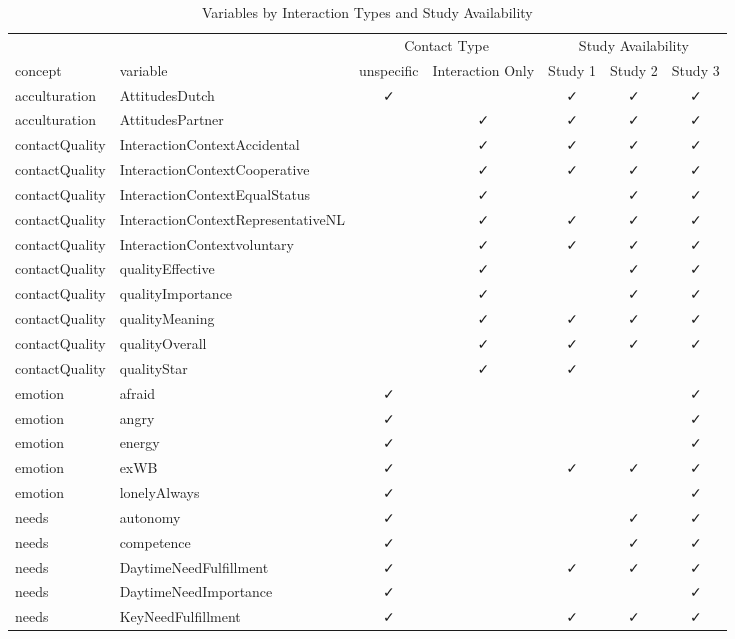 \begin{table}

\caption{\label{tab:variable names by response type and study}Variables by Interaction Types and Study Availability}
\centering
\begin{tabular}[t]{llccccc}
\toprule
\multicolumn{2}{c}{ } & \multicolumn{2}{c}{Contact Type} & \multicolumn{3}{c}{Study Availability} \\
\cmidrule(l{3pt}r{3pt}){3-4} \cmidrule(l{3pt}r{3pt}){5-7}
concept & variable & unspecific & Interaction Only & Study 1 & Study 2 & Study 3\\
\midrule
acculturation & AttitudesDutch & ✓ &  & ✓ & ✓ & ✓\\
acculturation & AttitudesPartner &  & ✓ & ✓ & ✓ & ✓\\
contactQuality & InteractionContextAccidental &  & ✓ & ✓ & ✓ & ✓\\
contactQuality & InteractionContextCooperative &  & ✓ & ✓ & ✓ & ✓\\
contactQuality & InteractionContextEqualStatus &  & ✓ &  & ✓ & ✓\\
\addlinespace
contactQuality & InteractionContextRepresentativeNL &  & ✓ & ✓ & ✓ & ✓\\
contactQuality & InteractionContextvoluntary &  & ✓ & ✓ & ✓ & ✓\\
contactQuality & qualityEffective &  & ✓ &  & ✓ & ✓\\
contactQuality & qualityImportance &  & ✓ &  & ✓ & ✓\\
contactQuality & qualityMeaning &  & ✓ & ✓ & ✓ & ✓\\
\addlinespace
contactQuality & qualityOverall &  & ✓ & ✓ & ✓ & ✓\\
contactQuality & qualityStar &  & ✓ & ✓ &  & \\
emotion & afraid & ✓ &  &  &  & ✓\\
emotion & angry & ✓ &  &  &  & ✓\\
emotion & energy & ✓ &  &  &  & ✓\\
\addlinespace
emotion & exWB & ✓ &  & ✓ & ✓ & ✓\\
emotion & lonelyAlways & ✓ &  &  &  & ✓\\
needs & autonomy & ✓ &  &  & ✓ & ✓\\
needs & competence & ✓ &  &  & ✓ & ✓\\
needs & DaytimeNeedFulfillment & ✓ &  & ✓ & ✓ & ✓\\
\addlinespace
needs & DaytimeNeedImportance & ✓ &  &  &  & ✓\\
needs & KeyNeedFulfillment & ✓ &  & ✓ & ✓ & ✓\\

\end{tabular}
\end{table}
